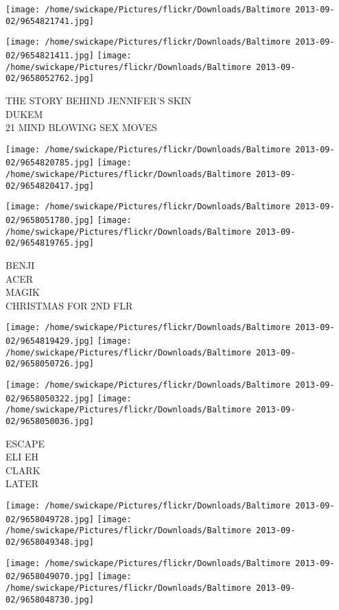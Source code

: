 \documentclass[10pt,letterpaper]{article}
\begin{document}
\texttt{[image: /home/swickape/Pictures/flickr/Downloads/Baltimore 2013-09-02/9654821741.jpg]}

\vspace{0.25in}
\texttt{[image: /home/swickape/Pictures/flickr/Downloads/Baltimore 2013-09-02/9654821411.jpg]}
\texttt{[image: /home/swickape/Pictures/flickr/Downloads/Baltimore 2013-09-02/9658052762.jpg]}

THE STORY BEHIND JENNIFER'S SKIN\\
DUKEM\\
21 MIND BLOWING SEX MOVES\\
\pagebreak

\texttt{[image: /home/swickape/Pictures/flickr/Downloads/Baltimore 2013-09-02/9654820785.jpg]}
\texttt{[image: /home/swickape/Pictures/flickr/Downloads/Baltimore 2013-09-02/9654820417.jpg]}

\texttt{[image: /home/swickape/Pictures/flickr/Downloads/Baltimore 2013-09-02/9658051780.jpg]}
\texttt{[image: /home/swickape/Pictures/flickr/Downloads/Baltimore 2013-09-02/9654819765.jpg]}

BENJI\\
ACER\\
MAGIK\\
CHRISTMAS FOR 2ND FLR\\
\pagebreak

\texttt{[image: /home/swickape/Pictures/flickr/Downloads/Baltimore 2013-09-02/9654819429.jpg]}
\texttt{[image: /home/swickape/Pictures/flickr/Downloads/Baltimore 2013-09-02/9658050726.jpg]}

\texttt{[image: /home/swickape/Pictures/flickr/Downloads/Baltimore 2013-09-02/9658050322.jpg]}
\texttt{[image: /home/swickape/Pictures/flickr/Downloads/Baltimore 2013-09-02/9658050036.jpg]}

ESCAPE\\
ELI EH\\
CLARK\\
LATER\\
\pagebreak

\texttt{[image: /home/swickape/Pictures/flickr/Downloads/Baltimore 2013-09-02/9658049728.jpg]}
\texttt{[image: /home/swickape/Pictures/flickr/Downloads/Baltimore 2013-09-02/9658049348.jpg]}

\texttt{[image: /home/swickape/Pictures/flickr/Downloads/Baltimore 2013-09-02/9658049070.jpg]}
\texttt{[image: /home/swickape/Pictures/flickr/Downloads/Baltimore 2013-09-02/9658048730.jpg]}
\end{document}
